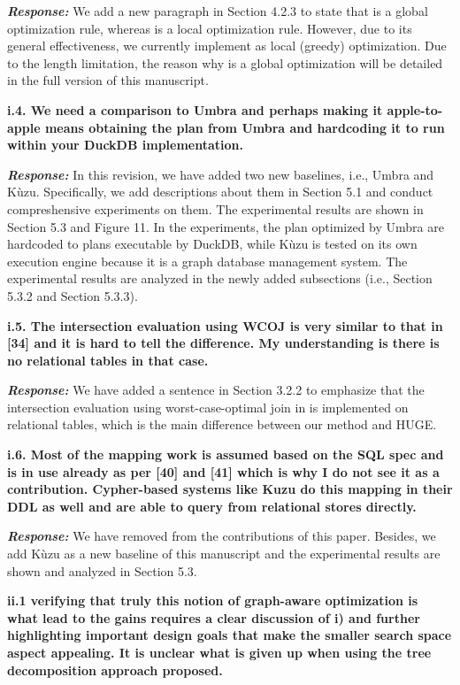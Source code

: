 \textbf{\textit{Response: }} We add a new paragraph in Section 4.2.3 to state that \filterrule is a global optimization rule, whereas \fusionrule is a local optimization rule. However, due to its general effectiveness, we currently implement \filterrule as local (greedy) optimization.
Due to the length limitation, the reason why \filterrule is a global optimization will be detailed in the full version of this manuscript.


\textbf{
i.4. We need a comparison to Umbra and perhaps making it apple-to-apple means obtaining the plan from Umbra and hardcoding it to run within your DuckDB implementation.
}

\textbf{\textit{Response: }} In this revision, we have added two new baselines, i.e., Umbra and K\`uzu.
Specifically, we add descriptions about them in Section 5.1 and conduct compreshensive experiments on them.
The experimental results are shown in Section 5.3 and Figure 11.
In the experiments, the plan optimized by Umbra are hardcoded to plans executable by DuckDB, while K\`uzu is tested on its own execution engine because it is a graph database management system.
The experimental results are analyzed in the newly added subsections (i.e., Section 5.3.2 and Section 5.3.3).


\textbf{
i.5. The intersection evaluation using WCOJ is very similar to that in [34] and it is hard to tell the difference. My understanding is there is no relational tables in that case.}

\textbf{\textit{Response: }}
We have added a sentence in Section 3.2.2 to emphasize that the intersection evaluation using worst-case-optimal join in \name is implemented on relational tables, which is the main difference between our method and HUGE.


\textbf{
i.6. Most of the mapping work is assumed based on the SQL spec and is in use already as per [40] and [41] which is why I do not see it as a contribution. Cypher-based systems like Kuzu do this mapping in their DDL as well and are able to query from relational stores directly.}

\textbf{\textit{Response: }}
We have removed \rgmapping from the contributions of this paper.
Besides, we add K\`uzu as a new baseline of this manuscript and the experimental results are shown and analyzed in Section 5.3.


\textbf{
ii.1 verifying that truly this notion of graph-aware optimization is what lead to the gains requires a clear discussion of i) and further highlighting important design goals that make the smaller search space aspect appealing.
It is unclear what is given up when using the tree decomposition approach proposed.}

